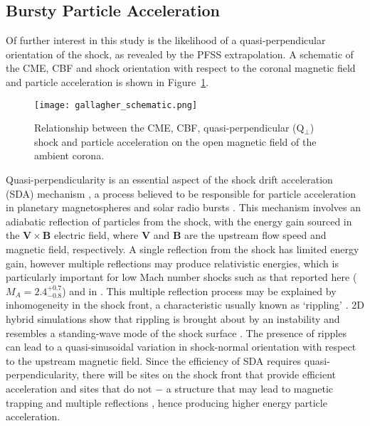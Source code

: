 \subsection{Bursty Particle Acceleration}\label{sec:sda_discussion}

Of further interest in this study is the likelihood of a quasi-perpendicular orientation of the shock, as revealed by the PFSS extrapolation. A schematic of the CME, CBF and shock orientation with respect to the coronal magnetic field and particle acceleration is shown in Figure~\ref{fig:shock_schematic}.
\begin{figure}
\begin{center}
\texttt{[image: gallagher\_schematic.png]}
\caption[CBF and shock orientation]{Relationship between the CME, CBF, quasi-perpendicular (Q$_{\perp}$) shock and particle acceleration on the open magnetic field of the ambient corona.}
\label{fig:shock_schematic}
\end{center}
\end{figure}
Quasi-perpendicularity is an essential aspect of the shock drift acceleration (SDA) mechanism \citep{ball2001}, a process believed to be responsible for particle acceleration in planetary magnetospheres \citep{wu1984} and solar radio bursts \citep{holman1983}.
This mechanism involves an adiabatic reflection of particles from the shock, with the energy gain sourced in the $\mathbf{V} \times \mathbf{B}$ electric field, where $\mathbf{V}$ and $\mathbf{B}$ are the upstream flow speed and magnetic field, respectively. A single reflection from the shock has limited energy gain, however multiple reflections may produce relativistic energies, which is particularly important for low Mach number shocks such as that reported here ($M_A =2.4^{+0.7}_{-0.8}$) and in \citep{guo2012}. This multiple reflection process may be explained by inhomogeneity in the shock front, a characteristic usually known as \textquoteleft rippling' \citep{zlobec1993, vandas2011}. 2D hybrid simulations show that rippling is brought about by an instability \citep{burgess2006} and resembles a standing-wave mode of the shock surface \citep{lowe2003}. The presence of ripples can lead to a quasi-sinusoidal variation in shock-normal orientation with respect to the upstream magnetic field. Since the efficiency of SDA requires quasi-perpendicularity, there will be sites on the shock front that provide efficient acceleration and sites that do not $-$ a structure that may lead to magnetic trapping and multiple reflections \citet{zlobec1993}, hence producing higher energy particle acceleration. 

